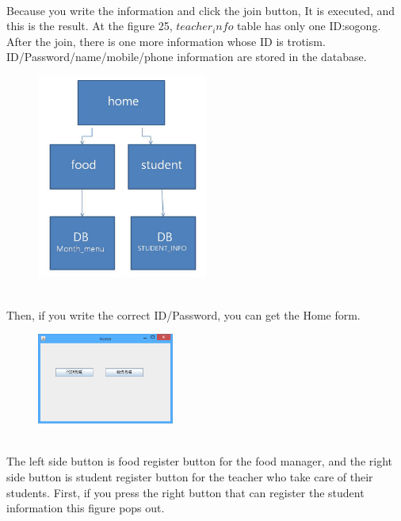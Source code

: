 \documentclass[a4paper,11pt]{IEEEtran}
\begin{document}
{{{\begin{figure}[!h]
        \caption{}
        \label{fig1}
\end{figure}
~\\
Because you write the information and click the join button, It is executed, and this is the result. At the figure 25, $teacher_info$ table has only one ID:sogong. After the join, there is one more information whose ID is trotism. ID/Password/name/mobile/phone information are stored in the database.
~\\
\begin{figure}[!h]
        \centering
        \includegraphics[width=0.5\textwidth, height=0.4\textheight]{usec7.jpg}
        \caption{}
        \label{fig1}
\end{figure}
~\\
Then, if you write the correct ID/Password, you can get the Home form.
~\\
\begin{figure}[!h]
        \centering
        \includegraphics[width=0.4\textwidth]{usec8.jpg}
        \caption{}
        \label{fig1}
\end{figure}
~\\
The left side button is food register button for the food manager, and the right side button is student register button for the teacher who take care of their students. 
First, if you press the right button that can register the student information this figure pops out.
~\\
}}}
\end{document}
